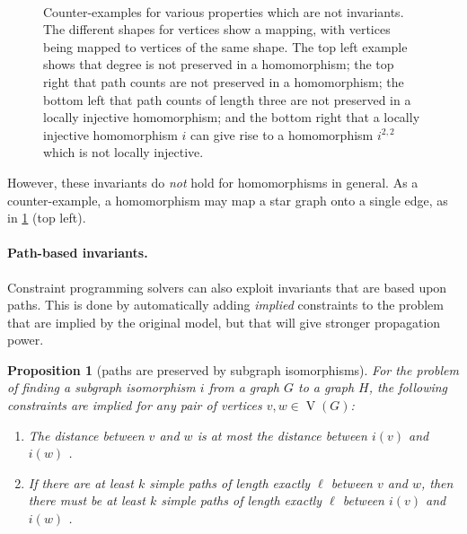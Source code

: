 \documentclass{article}
\newtheorem{proposition}{Proposition}
\newcommand{\vertexset}{\operatorname{V}}
\begin{document}
\begin{figure}
\begin{minipage}{3cm}
\end{minipage}\hfill\,

    \caption{Counter-examples for various properties which are not invariants. The different shapes
        for vertices show a mapping, with vertices being mapped to vertices of the same shape. The
        top left example shows that degree is not preserved in a homomorphism; the top right that path
        counts are not preserved in a homomorphism; the bottom left that path counts of length three
        are not preserved in a locally injective homomorphism; and the bottom right that a locally
        injective homomorphism $i$ can give rise to a homomorphism $i^{2,2}$ which is not locally
        injective.} \label{figure:counterexamples}
\end{figure}

However, these invariants do \emph{not} hold for homomorphisms in general. As a
counter-example, a homomorphism may map a star graph onto a single edge, as in
\cref{figure:counterexamples} (top left).

\paragraph{Path-based invariants.} Constraint programming solvers can also exploit
invariants that are based upon paths. This is done by automatically adding \emph{implied}
constraints to the problem that are implied by the original model, but that will give stronger
propagation power.

\begin{proposition}[paths are preserved by subgraph isomorphisms]\label{proposition:distances}For
    the problem of finding a subgraph isomorphism $i$ from a graph $G$ to a graph $H$, the following
    constraints are implied for any pair of vertices $v, w \in \vertexset(G)$:
    \begin{enumerate}
        \item The distance between $v$ and $w$ is at most the distance between $i(v)$ and $i(w)$
            \cite{DBLP:conf/cp/AudemardLMGP14}.
        \item If there are at least $k$ simple
            paths of length exactly $\ell$ between $v$ and $w$, then there must be at least $k$
            simple paths of length exactly $\ell$ between $i(v)$ and $i(w)$
            \cite{DBLP:conf/cp/McCreeshP15}.
    \end{enumerate}
\end{proposition}
\end{document}

